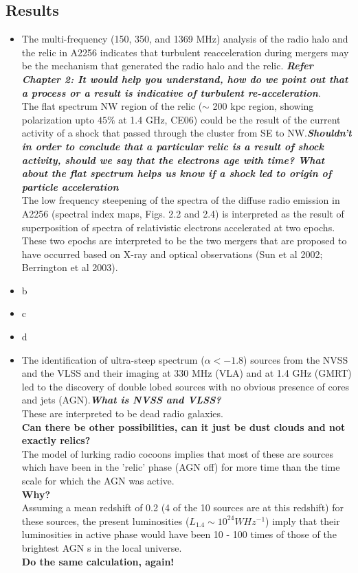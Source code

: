 \documentclass[11pt]{report}
\newcommand{\tit}[1]{\textit{#1}}
\begin{document}
\subsection{Results}
\begin{itemize}

\item The multi-frequency (150, 350, and 1369 MHz) analysis of the radio halo and the relic in A2256 indicates that turbulent reacceleration during mergers may be the mechanism that generated the radio halo and the relic. \textbf{\textit{Refer Chapter 2: It would help you understand, how do we point out that a process or a result is indicative of turbulent re-acceleration}}.\\
The flat spectrum NW region of the relic ($\sim$ 200 kpc region, showing polarization upto $45\%$ at 1.4 GHz, CE06) could be the result of the current activity of a shock that passed through the cluster from SE to NW.\textbf{\tit{Shouldn't in order to conclude that a particular relic is a result of shock activity, should we say that the electrons age with time? What about the flat spectrum helps us know if a shock led to origin of particle acceleration}}\\
 The low frequency steepening of the spectra of the diffuse radio emission in A2256 (spectral index maps, Figs. 2.2 and 2.4) is interpreted as the result of superposition of spectra of relativistic electrons accelerated at two epochs. These two epochs are interpreted to be the two mergers that are proposed to have occurred based on X-ray and optical observations (Sun et al 2002; Berrington et al
2003).

\item b

\item c
\item d
\item  The identification of ultra-steep spectrum ($\alpha < - 1.8$) sources from the NVSS and the VLSS and their imaging at 330 MHz (VLA) and at 1.4 GHz (GMRT) led to the discovery of double lobed sources with no obvious presence of cores and jets (AGN).\textbf{\tit{What is NVSS and VLSS?}}\\
 These are interpreted to be dead radio galaxies.\\
\textbf{Can there be other possibilities, can it just be dust clouds and not exactly relics?}\\ 
  The model of lurking radio cocoons implies that most of these are sources which have been in the 'relic' phase (AGN off) for more time than the time scale for which the AGN was active. \\\textbf{Why?}\\
Assuming a mean redshift of 0.2 (4 of the 10 sources are at this redshift) for these sources, the present luminosities ($L_{1.4} \sim 10^{24}W Hz^{-1}$) imply that their luminosities in active phase would have been 10 - 100 times of those of the brightest AGN s in the local universe.\\
\textbf{Do the same calculation, again!}\\


\end{itemize}
\end{document}
